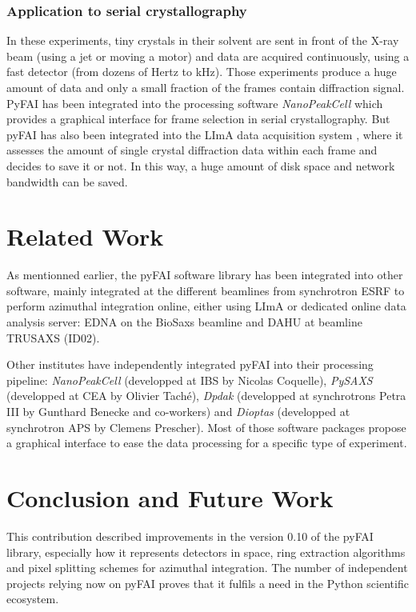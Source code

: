 \documentclass[preprint]{iucr}
\begin{document}
\subsubsection{Application to serial crystallography}
In these experiments, tiny crystals in their solvent are sent in
front of the X-ray beam (using a jet or moving a motor) and data are acquired
continuously, using a fast detector (from dozens of Hertz to kHz).
Those experiments produce a huge amount of data and only a small fraction of the
frames contain diffraction signal.
PyFAI has been integrated into the processing software \textit{NanoPeakCell}
which provides a graphical interface for frame selection in serial crystallography.
But pyFAI has also been integrated into the LImA data acquisition system
\cite{lima}, where it assesses the amount of single crystal
diffraction data within each frame and decides to save it or not.
In this way, a huge amount of disk space and network bandwidth
can be saved.

\section{Related Work}

As mentionned earlier, the pyFAI software library has been integrated
into other software, mainly integrated at the different beamlines from
synchrotron ESRF to perform azimuthal integration online, either using LImA or
dedicated online data analysis server: EDNA \cite{edna} on the
BioSaxs beamline \cite{bm29} and DAHU at beamline TRUSAXS (ID02).

Other institutes have independently integrated pyFAI into their processing
pipeline: \textit{NanoPeakCell} (developped at IBS by Nicolas Coquelle),
\textit{PySAXS} (developped at CEA by Olivier Taché), \textit{Dpdak} (developped
at synchrotrons Petra III by Gunthard Benecke and co-workers) \cite{dpdak}
and \textit{Dioptas} (developped at synchrotron APS by Clemens Prescher).
Most of those software packages propose a graphical interface to ease the
data processing for a specific type of experiment.

\section{Conclusion and Future Work}

This contribution described improvements in the version 0.10 of the pyFAI
library, especially how it represents detectors in space, ring
extraction algorithms and pixel splitting schemes for azimuthal integration.
The number of independent projects relying now on pyFAI proves that it fulfils a
need in the Python scientific ecosystem.
\end{document}
